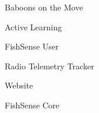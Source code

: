 \item Baboons on the Move
\item Active Learning
\item FishSense User
\item Radio Telemetry Tracker
\item Website
\item FishSense Core
